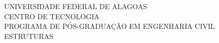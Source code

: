 \documentclass[
	12pt,				%
	oneside,			%
	a4paper,			%
	sumario=abnt-6027-2012, %
	chapter=TITLE, 	%
	english,			%
	french,				%
	spanish,			%
	brazil,				%
	]{abntex2}
\begin{document}
\frenchspacing 


\renewcommand{\imprimircapa}{%
\begin{capa}%
\center
\ABNTEXchapterfont \large
UNIVERSIDADE FEDERAL DE ALAGOAS \\
CENTRO DE TECNOLOGIA \\
PROGRAMA DE PÓS-GRADUAÇÃO EM ENGENHARIA CIVIL \\ 
ESTRUTURAS\\
\vspace*{3cm}
{\ABNTEXchapterfont\imprimirautor}
\vspace*{3cm}
\begin{center}
\ABNTEXchapterfont\bfseries\imprimirtitulo
\end{center}
\vfill
\large\imprimirlocal \\
\large\imprimirdata
\vspace*{1cm}
\end{capa}
}
\imprimircapa


\makeatletter
\renewcommand{\folhaderostocontent}{
\begin{center}
{\ABNTEXchapterfont\large\imprimirautor}
\vspace*{\fill}\vspace*{\fill}
\begin{center}
\ABNTEXchapterfont\bfseries\Large\imprimirtitulo
\end{center}
\vspace*{\fill}
\abntex@ifnotempty{\imprimirpreambulo}{%
\hspace{.45\textwidth}
\begin{minipage}{.5\textwidth}
\SingleSpacing
\imprimirpreambulo \\
\\
{\imprimirorientadorRotulo~\imprimirorientador\par}
\abntex@ifnotempty{\imprimircoorientador}{%
{\imprimircoorientadorRotulo~\imprimircoorientador}%
}%
\end{minipage}%
\vspace*{\fill}
}%
\vfill
{\large\imprimirlocal} \\
{\large\imprimirdata}
\vspace*{1cm}
\end{center}
}
\makeatother
\end{document}
